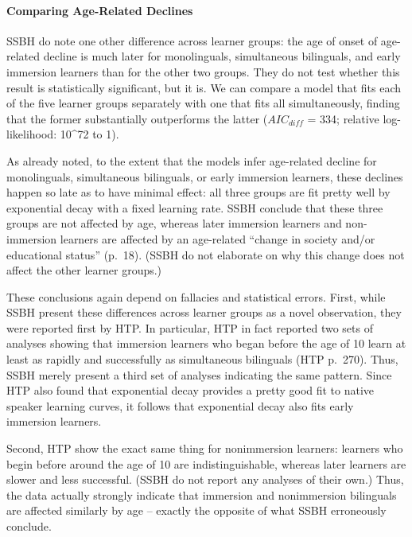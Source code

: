 \documentclass[
  english,
  doc,floatsintext]{apa6}
\let\oldparagraph\paragraph
\renewcommand{\paragraph}[1]{\oldparagraph{#1}\mbox{}}
\begin{document}
\hypertarget{comparing-age-related-declines}{%
\paragraph{Comparing Age-Related Declines}\label{comparing-age-related-declines}}

SSBH do note one other difference across learner groups: the age of onset of age-related decline is much later for monolinguals, simultaneous bilinguals, and early immersion learners than for the other two groups. They do not test whether this result is statistically significant, but it is. We can compare a model that fits each of the five learner groups separately with one that fits all simultaneously, finding that the former substantially outperforms the latter (\(AIC_{diff}\) = 334; relative log-likelihood: 10\^{}72 to 1).

As already noted, to the extent that the models infer age-related decline for monolinguals, simultaneous bilinguals, or early immersion learners, these declines happen so late as to have minimal effect: all three groups are fit pretty well by exponential decay with a fixed learning rate. SSBH conclude that these three groups are not affected by age, whereas later immersion learners and non-immersion learners are affected by an age-related ``change in society and/or educational status'' (p.~18). (SSBH do not elaborate on why this change does not affect the other learner groups.)

These conclusions again depend on fallacies and statistical errors. First, while SSBH present these differences across learner groups as a novel observation, they were reported first by HTP. In particular, HTP in fact reported two sets of analyses showing that immersion learners who began before the age of 10 learn at least as rapidly and successfully as simultaneous bilinguals (HTP p.~270). Thus, SSBH merely present a third set of analyses indicating the same pattern. Since HTP also found that exponential decay provides a pretty good fit to native speaker learning curves, it follows that exponential decay also fits early immersion learners.

Second, HTP show the exact same thing for nonimmersion learners: learners who begin before around the age of 10 are indistinguishable, whereas later learners are slower and less successful. (SSBH do not report any analyses of their own.) Thus, the data actually strongly indicate that immersion and nonimmersion bilinguals are affected similarly by age -- exactly the opposite of what SSBH erroneously conclude.
\end{document}
